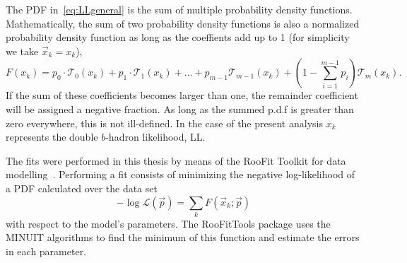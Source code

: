 
The PDF in~\ref{eq:LLgeneral} is the sum  of multiple probability density functions. Mathematically, the sum of two probability density functions is also a normalized probability density function as long as the coeffients add up to 1 (for simplicity we take $\vec{x}_k=x_k$),
% 
\begin{equation} 
F(x_k) = p_0 \cdot \mathcal{T}_0(x_k) + p_1 \cdot \mathcal{T}_1(x_k)+...+p_{m-1}\mathcal{T}_{m-1}(x_k)+ (1-\sum^{m-1}_{i=1}p_i) \mathcal{T}_m(x_k).
\end{equation}
%
If the sum of these coefficients becomes larger than one, the remainder coefficient will be assigned a negative fraction. As long as the summed p.d.f is greater than zero everywhere, this is not ill-defined. %
In the case of the present analysis $x_k$ represents the double $b$-hadron likelihood, LL. 

The fits were performed in this thesis by means of the RooFit Toolkit for data modelling~\cite{RooFit}. Performing a fit consists of minimizing the negative log-likelihood of a PDF calculated over the data set %
%
\begin{equation}
-\log \mathcal{L} (\vec{p}) = \sum_k F(\vec{x}_k;\vec{p})
\end{equation}
%
with respect to the model's parameters.  The RooFitTools package uses the MINUIT\cite{MINUIT} algorithms to find the minimum of this function and estimate the errors in each parameter.  %


